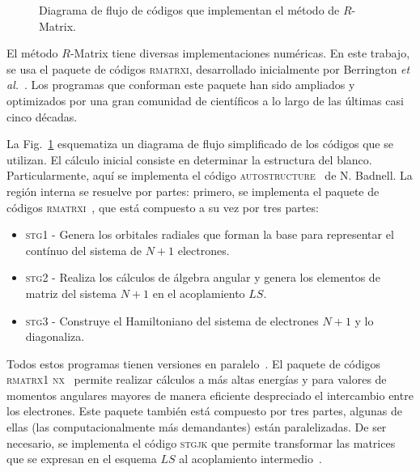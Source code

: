 \begin{figure}
\vspace{0.5cm}
\caption{Diagrama de flujo de códigos que implementan el método de
$R$-Matrix.}
\label{fig:rmatrixcodes}
\end{figure}

El método $R$-Matrix tiene diversas implementaciones numéricas. En este 
trabajo, se usa el paquete de códigos \textsc{rmatrxi}, desarrollado 
inicialmente por Berrington \textit{et al.}~\cite{Berrington:74}. Los
programas que conforman este paquete han sido ampliados y optimizados
por una gran comunidad de científicos a lo largo de las últimas casi
cinco décadas. 

La Fig.~\ref{fig:rmatrixcodes} esquematiza un diagrama de flujo 
simplificado de los códigos que se utilizan. El cálculo inicial consiste 
en determinar la estructura del blanco. Particularmente, aquí se 
implementa el código \textsc{autostructure}~\cite{Badnell:11} de 
N. Badnell. La región interna se resuelve por partes: primero, se 
implementa el paquete de códigos \textsc{rmatrxi}~\cite{Berrington:95}, 
que está compuesto a su vez por tres partes: 
\begin{itemize}
\item \textsc{stg1} - Genera los orbitales radiales que forman la base
para representar el contínuo del sistema de $N+1$ electrones.
\item \textsc{stg2} - Realiza los cálculos de álgebra angular y genera 
los elementos de matriz del sistema $N+1$ en el acoplamiento $LS$.
\item \textsc{stg3} - Construye el Hamiltoniano del sistema de 
electrones $N+1$ y lo diagonaliza.
\end{itemize}
Todos estos programas tienen versiones en paralelo~\cite{Mitnik:99,
Mitnik:01,Ballance:04}. 
El paquete de códigos \textsc{rmatrx1 nx}~\cite{Burke:92} permite 
realizar cálculos a más altas energías y para valores de momentos 
angulares mayores de manera eficiente despreciado el intercambio entre 
los electrones. Este paquete también está compuesto por tres partes, 
algunas de ellas (las computacionalmente más demandantes) están 
paralelizadas. De ser necesario, se implementa el código \textsc{stgjk} 
que permite transformar las matrices que se expresan en el esquema $LS$ 
al acoplamiento intermedio~\cite{Griffin:98}.

